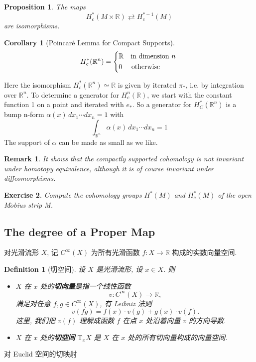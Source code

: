 \documentclass{article}
\newtheorem{definition}{Definition}[subsection]
\newtheorem{remark}{Remark}
\newtheorem{proposition}{Proposition}[section]
\newtheorem{exercise}[proposition]{Exercise}
\newtheorem{corollary}{Corollary}[proposition]
\begin{document}
\begin{proposition}
    The maps 
    \[H_c^*(M\times \mathbb{R })\rightleftarrows H_c^{*-1}(M)\]
    are isomorphisms.
\end{proposition}
\begin{corollary}[Poincar\'{e} Lemma for Compact Supports]
    \[
        H_c^*(\mathbb{R}^n)=\left\{
            \begin{aligned}
                &\mathbb{R}\quad\text{in dimension  $ n $ }\\
                &0\quad\,\,\text{otherwise}
            \end{aligned}
        \right.
    \]
\end{corollary}
Here the isomorphism  $ H_c^*(\mathbb{R}^n)\simeq \mathbb{R} $ is given by iterated  $ \pi_* $, i.e. by integration over  $ \mathbb{R}^n $.
To determine a generator for  $ H^n_c(\mathbb{R}) $, we start with the constant function 1 on a point and iterated with  $ e_* $. So a generator for  $ H_C^*(\mathbb{R}^n) $ is a bump n-form  $ \alpha(x)\,dx_1\cdots dx_n=1 $ with 
\[\int_{\mathbb{R}^n}\alpha(x)\,dx_1\cdots dx_n=1\]
The support of  $ \alpha  $ can be made as small as we like.     
\begin{remark}
    It shows that the compactly supported cohomology is not invariant under homotopy equivalence, although it is of course invariant under diffeomorphisms.
\end{remark}
\begin{exercise}
    Compute the cohomology groups  $ H^*(M) $ and  $ H^*_c(M) $ of the open M$ \ddot{o} $bius strip M.  
\end{exercise}
\subsection{The degree of a Proper Map}

对光滑流形 $X$, 记 $C^\infty (X)$ 为所有光滑函数
$f \colon X \to \mathbb{R}$ 构成的实数向量空间.

\begin{definition} [切空间]
    \label{一般定义}
    设 $X$ 是光滑流形, 设 $x \in X$. 则
    \begin{itemize}
        \item
            $X$ 在 $x$ 处的\textbf{切向量}是指一个线性函数
            \[
                v \colon C^\infty (X) \to \mathbb{R},
            \]
            满足对任意 $f, g \in C^\infty (X)$, 有 Leibniz 法则
            \[
                v (f g) = f (x) \cdot v (g) + g (x) \cdot v (f).
            \]
            这里, 我们把 $v (f)$ 理解成函数 $f$
            在点 $x$ 处沿着向量 $v$ 的方向导数.
        \item
            $X$ 在 $x$ 处的\textbf{切空间} $\mathrm{T}_x X$
            是 $X$ 在 $x$ 处的所有切向量构成的向量空间.
    \end{itemize}
\end{definition}
对 Euclid 空间的切映射
\end{document}
